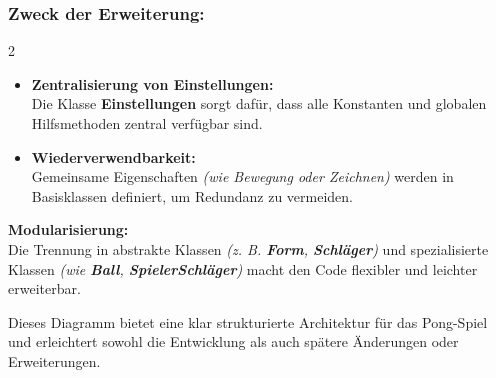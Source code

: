 \documentclass[a4paper,12pt]{article}
\begin{document}
\subsubsection{Zweck der Erweiterung:}
\begin{multicols}{2}
\begin{itemize}[label={},leftmargin=*,noitemsep,topsep=0pt,parsep=0pt]
    \item \textbf{Zentralisierung von Einstellungen:} \\ Die Klasse \textbf{Einstellungen} sorgt dafür, dass alle Konstanten und globalen Hilfsmethoden zentral verfügbar sind.
    \columnbreak
    \item \textbf{Wiederverwendbarkeit:} \\ Gemeinsame Eigenschaften \textit{(wie Bewegung oder Zeichnen)} werden in Basisklassen definiert, um Redundanz zu vermeiden.
\end{itemize}
\end{multicols}
\noindent
\textbf{Modularisierung:} \\ Die Trennung in abstrakte Klassen \textit{(z. B. \textbf{Form}, \textbf{Schläger})} und spezialisierte Klassen \textit{(wie \textbf{Ball}, \textbf{SpielerSchläger})} macht den Code flexibler und leichter erweiterbar. \par \vspace\baselineskip
Dieses Diagramm bietet eine klar strukturierte Architektur für das Pong-Spiel und erleichtert sowohl die Entwicklung als auch spätere Änderungen oder Erweiterungen.
\clearpage
\end{document}
